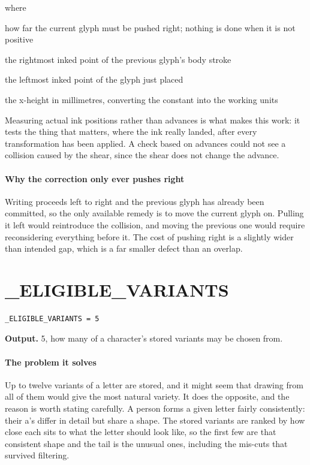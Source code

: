 \noindent where
\begin{description}[leftmargin=2.4em,style=nextline,font=\normalfont\ttfamily]\setlength\itemsep{1pt}
  \item[{$\mathrm{need}$}] \normalfont how far the current glyph must be pushed right; nothing is done when it is not positive
  \item[{$x^{\mathrm{prev}}_{\max}$}] \normalfont the rightmost inked point of the previous glyph's body stroke
  \item[{$x^{\mathrm{cur}}_{\min}$}] \normalfont the leftmost inked point of the glyph just placed
  \item[{$\mathrm{xh}$}] \normalfont the x-height in millimetres, converting the constant into the working units
\end{description}
Measuring actual ink positions rather than advances is what makes this work: it tests the thing that matters, where the ink really landed, after every transformation has been applied. A check based on advances could not see a collision caused by the shear, since the shear does not change the advance.


\paragraph{Why the correction only ever pushes right}
Writing proceeds left to right and the previous glyph has already been committed, so the only available remedy is to move the current glyph on. Pulling it left would reintroduce the collision, and moving the previous one would require reconsidering everything before it. The cost of pushing right is a slightly wider than intended gap, which is a far smaller defect than an overlap.


\section{\_ELIGIBLE\_VARIANTS}
\begin{lstlisting}[style=sig]
_ELIGIBLE_VARIANTS = 5
\end{lstlisting}

\noindent\textbf{Output.} 5, how many of a character's stored variants may be chosen from.


\paragraph{The problem it solves}
Up to twelve variants of a letter are stored, and it might seem that drawing from all of them would give the most natural variety. It does the opposite, and the reason is worth stating carefully. A person forms a given letter fairly consistently: their a's differ in detail but share a shape. The stored variants are ranked by how close each sits to what the letter should look like, so the first few are that consistent shape and the tail is the unusual ones, including the mis-cuts that survived filtering.

